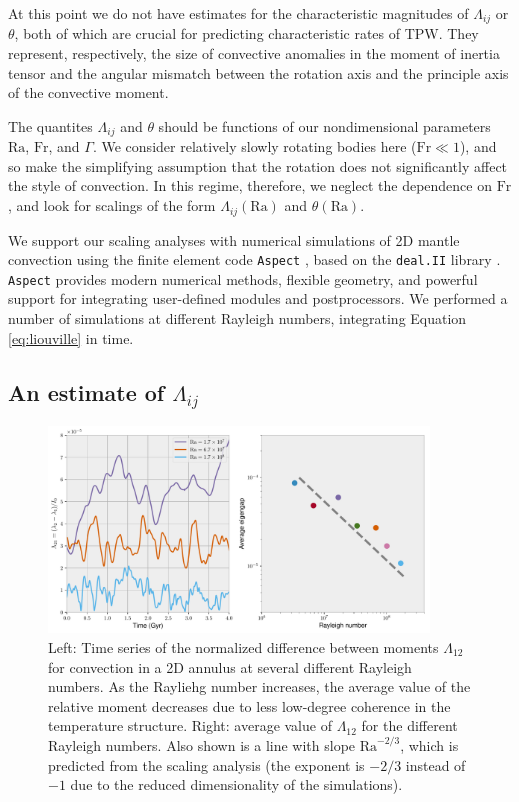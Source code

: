 \documentclass[extra,mreferee]{gji}
\begin{document}
At this point we do not have estimates for the characteristic magnitudes of $\Lambda_{ij}$ or $\theta$, both of which are crucial for predicting characteristic rates of TPW.
They represent, respectively, the size of convective anomalies in the moment of inertia tensor and the angular mismatch between the rotation axis and the principle axis of the convective moment.


The quantites $\Lambda_{ij}$ and $\theta$ should be functions of our nondimensional parameters $\mathrm{Ra}$, $\mathrm{Fr}$, and $\Gamma$.  
We consider relatively slowly rotating bodies here ($\mathrm{Fr} \ll 1$), and so make the simplifying assumption that the rotation does not significantly affect the style of convection.  
In this regime, therefore, we neglect the dependence on $\mathrm{Fr}$, and look for scalings of the form $\Lambda_{ij}(\mathrm{Ra})$ and $\theta(\mathrm{Ra})$.

We support our scaling analyses with numerical simulations of 2D mantle convection using the finite element code \texttt{Aspect} \citep{kronbichler2012high}, based on the \texttt{deal.II} library \citep{dealII81}.  
\texttt{Aspect} provides modern numerical methods, flexible geometry, and powerful support for integrating user-defined modules and postprocessors.
We performed a number of simulations at different Rayleigh numbers, integrating Equation \ref{eq:liouville} in time.

\subsection{An estimate of $\Lambda_{ij}$}

\begin{figure}
\centering
\label{misfit}
\includegraphics[width=0.9\textwidth]{figures/eigengap.pdf}
\caption{ Left: Time series of the normalized difference between moments $\Lambda_{12}$ for convection in a 2D annulus at several different Rayleigh numbers.  As the Rayliehg number increases, the average value of the relative moment decreases due to less low-degree coherence in the temperature structure.  Right:  average value of $\Lambda_{12}$ for the different Rayleigh numbers.  Also shown is a line with slope $\mathrm{Ra}^{-2/3}$, which is predicted from the scaling analysis (the exponent is $-2/3$ instead of $-1$ due to the reduced dimensionality of the simulations).}
\end{figure}
\end{document}
